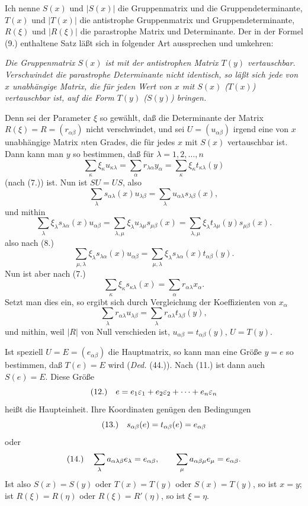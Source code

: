 \documentclass[11pt]{article}
\newcommand{\eps}{\varepsilon}
\newcommand{\fnum}[1]{\textup{(\ensuremath{#1}.)}\quad}
\begin{document}
Ich nenne $S(x)$ und $|S(x)|$ die Gruppenmatrix und die Gruppendeterminante, $T(x)$ und $|T(x)|$ die antistrophe Gruppenmatrix und Gruppendeterminante, $R(\xi)$ und $|R(\xi)|$ die parastrophe Matrix und Determinante. Der in der Formel (9.) enthaltene Satz läßt sich in folgender Art aussprechen und umkehren:

\emph{Die Gruppenmatrix $S(x)$ ist mit der antistrophen Matrix $T(y)$ vertauschbar. Verschwindet die parastrophe Determinante nicht identisch, so läßt sich jede von $x$ unabhängige Matrix, die für jeden Wert von $x$ mit $S(x)$ ($T(x)$) vertauschbar ist, auf die Form $T(y)$ ($S(y)$) bringen.}

Denn sei der Parameter $\xi$ so gewählt, daß die Determinante der Matrix $R(\xi)=R=(r_{\alpha\beta})$ nicht verschwindet, und sei $U=(u_{\alpha\beta})$ irgend eine von $x$ unabhängige Matrix $n$ten Grades, die für jedes $x$ mit $S(x)$ vertauschbar ist. Dann kann man $y$ so bestimmen, daß für $\lambda=1,2,\ldots,n$
\[
 \sum_\kappa \xi_\kappa u_{\kappa\lambda}
 =\sum_\alpha r_{\lambda\alpha}y_\alpha
 =\sum_\kappa \xi_\kappa t_{\kappa\lambda}(y)
\]
(nach (7.)) ist. Nun ist $SU=US$, also
\[
 \sum_\lambda s_{\alpha\lambda}(x)u_{\lambda\beta}
 =\sum_\lambda u_{\alpha\lambda}s_{\lambda\beta}(x),
\]
und mithin
\[
 \sum_\lambda\xi_\lambda s_{\lambda\alpha}(x)u_{\alpha\beta}
 =\sum_{\lambda,\mu}\xi_\lambda u_{\lambda\mu}s_{\mu\beta}(x)
 =\sum_{\lambda,\mu}\xi_\lambda t_{\lambda\mu}(y)s_{\mu\beta}(x).
\]
also nach (8.)
\[
 \sum_{\mu,\lambda}\xi_\lambda s_{\lambda\alpha}(x)u_{\alpha\beta}
 =\sum_{\mu,\lambda}\xi_\lambda s_{\lambda\alpha}(x)t_{\alpha\beta}(y).
\]
Nun ist aber nach (7.)
\[
 \sum_\kappa \xi_\kappa s_{\kappa\lambda}(x)=\sum_\alpha r_{\alpha\lambda}x_\alpha.
\]
Setzt man dies ein, so ergibt sich durch Vergleichung der Koeffizienten von $x_\alpha$
\[
 \sum_\lambda r_{\alpha\lambda}u_{\lambda\beta}
 =\sum_\lambda r_{\alpha\lambda}t_{\lambda\beta}(y),
\]
und mithin, weil $|R|$ von Null verschieden ist, $u_{\alpha\beta}=t_{\alpha\beta}(y)$, $U=T(y)$.

Ist speziell $U=E=(e_{\alpha\beta})$ die Hauptmatrix, so kann man eine Größe $y=e$ so bestimmen, daß $T(e)=E$ wird (\emph{Ded.} (44.)). Nach (11.) ist dann auch $S(e)=E$. Diese Größe
\[
\fnum{12} e=e_1\eps_1+e_2\eps_2+\cdots+e_n\eps_n
\]
heißt die Haupteinheit. Ihre Koordinaten genügen den Bedingungen
\[
\fnum{13} s_{\alpha\beta}(e)=t_{\alpha\beta}(e)=e_{\alpha\beta}
\]
oder
\[
\fnum{14} \sum_\lambda a_{\alpha\lambda\beta}e_\lambda=e_{\alpha\beta},\qquad
\sum_\mu a_{\alpha\beta\mu}e_\mu=e_{\alpha\beta}.
\]
Ist also $S(x)=S(y)$ oder $T(x)=T(y)$ oder $S(x)=T(y)$, so ist $x=y$; ist $R(\xi)=R(\eta)$ oder $R(\xi)=R'(\eta)$, so ist $\xi=\eta$.
\end{document}
